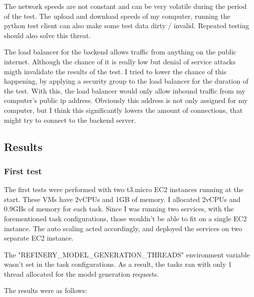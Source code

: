 			The network speeds are not constant and can be very volatile during the period of the test. The upload and download speeds of my computer, running the 
			python test client can also make some test data dirty / invalid.  Repeated testing should also solve this threat.

			The load balancer for the backend allows traffic from anything on the public internet. Although the chance of it is really low
			but denial of service attacks migth invalidate the results of the test. I tried to lower the chance of this happening, by applying a security group
			to the load balancer for the duration of the test. With this, the load balancer would only allow inbound traffic from my computer's public ip address.
			Obviously this address is not only assigned for my computer, but I think this significantly lowers the amount of connections, that might try to connect 
			to the backend server.

		\subsection{Results}
		\subsubsection{First test} \label{firsttest}
		The first tests were performed with two t3.micro EC2 instances running at the start. These VMs have 2vCPUs and 1GB of memory. I allocated
		2vCPUs and 0.9GBs of memory for each task. Since I was running two services, with the forementioned task configurations, 
		those wouldn't be able to fit on a single EC2 instance. The auto scaling acted accordingly, and deployed the services on two 
		separate EC2 instance. 

		The "REFINERY\_MODEL\_GENERATION\_THREADS" environment variable wasn't set in the task configurations. As a result, the tasks ran with only 1 thread
		allocated for the model generation requests.

		The results were as follows:

